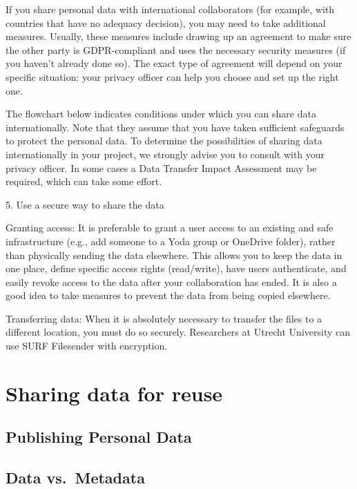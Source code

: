 \documentclass[
]{book}
\begin{document}
If you share personal data with international collaborators (for example,
with countries that have no
adequacy decision),
you may need to take additional measures. Usually, these measures include
drawing up an agreement to make sure the other party is GDPR-compliant and
uses the necessary security measures (if you haven't already done so). The
exact type of agreement will depend on your specific situation: your
privacy officer
can help you choose and set up the right one.

The flowchart below indicates conditions under which you can share data
internationally. Note that they assume that you have taken sufficient
safeguards to protect the personal data. To determine the possibilities
of sharing data internationally in your project, we strongly advise you
to consult with your privacy officer. In some cases a Data Transfer Impact Assessment may
be required, which can take some effort.

5. Use a secure way to share the data

Granting access: It is preferable to grant a user access
to an existing and safe infrastructure (e.g., add someone to a Yoda
group or OneDrive folder), rather than physically sending the data
elsewhere. This allows you to keep the data in one place, define
specific access rights (read/write), have users authenticate, and
easily revoke access to the data after your collaboration has ended.
It is also a good idea to take measures to prevent the data from
being copied elsewhere.

Transferring data: When it is absolutely necessary to
transfer the files to a different location, you must do so securely.
Researchers at Utrecht University can use
SURF Filesender
with encryption.

\hypertarget{data-sharing-reuse}{%
\chapter{Sharing data for reuse}\label{data-sharing-reuse}}

\hypertarget{publishing-personal-data}{%
\section{Publishing Personal Data}\label{publishing-personal-data}}

\hypertarget{data-vs.-metadata}{%
\section{Data vs.~Metadata}\label{data-vs.-metadata}}
\end{document}

